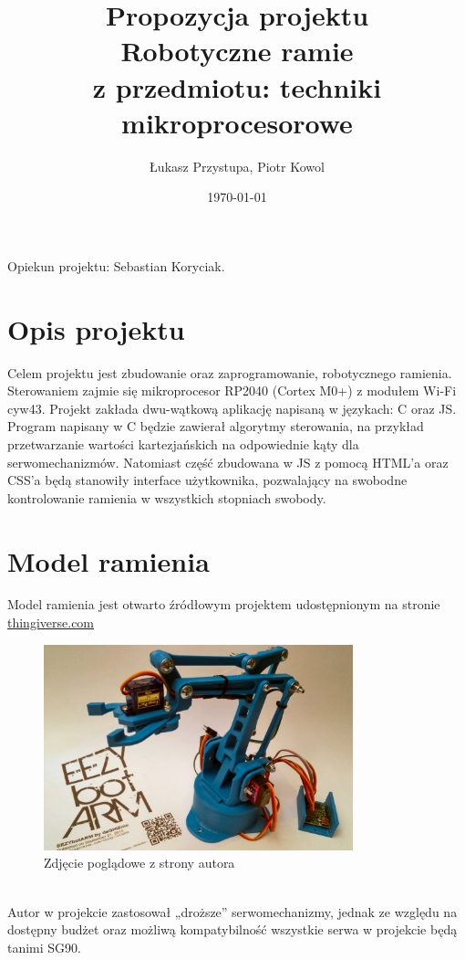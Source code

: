 \documentclass[12pt]{article}
\title{Propozycja projektu\\ \textbf{Robotyczne ramie} {\small \\ z przedmiotu: techniki mikroprocesorowe}}
\author{Łukasz Przystupa, Piotr Kowol}
\date{\today}
\begin{document}
    \begin{titlepage}
        \maketitle
        \thispagestyle{empty}
        \begin{center}
            Opiekun projektu: Sebastian Koryciak.
        \end{center}
    \end{titlepage}

    \section{Opis projektu}
        \tab Celem projektu jest zbudowanie oraz zaprogramowanie, robotycznego ramienia. 
        Sterowaniem zajmie się mikroprocesor RP2040 (Cortex M0+) z modułem Wi-Fi cyw43.
        Projekt zakłada dwu-wątkową aplikację napisaną w językach: C oraz JS.
        Program napisany w C będzie zawierał algorytmy sterowania, na przykład przetwarzanie wartości kartezjańskich na odpowiednie kąty dla serwomechanizmów.
        Natomiast część zbudowana w JS z pomocą HTML'a oraz CSS'a będą stanowiły interface użytkownika, pozwalający na swobodne kontrolowanie ramienia w wszystkich stopniach swobody.

    \section{Model ramienia}
        \tab Model ramienia jest otwarto źródłowym projektem udostępnionym na stronie \href{https://www.thingiverse.com/thing:1015238}{thingiverse.com}
        \begin{figure}[!ht]
            \centering
            \includegraphics[width = 0.8\textwidth]{arm.jpg}
            \caption{Zdjęcie poglądowe z strony autora}
        \end{figure}\\
        Autor w projekcie zastosował „droższe” serwomechanizmy, jednak ze względu na dostępny budżet
         oraz możliwą kompatybilność wszystkie serwa w projekcie będą tanimi SG90.
\end{document}
